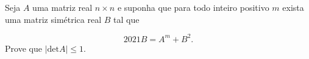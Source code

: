 Seja \(A\) uma matriz real \(n \times n\) e suponha que para todo inteiro positivo \(m\) exista uma matriz simétrica real \(B\) tal que

\[2021B = A^m+B^2.\]
Prove que \(|\text{det} A| \leq 1\).
